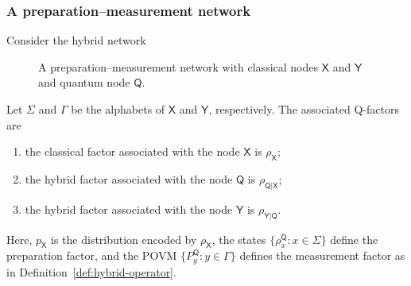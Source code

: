 \documentclass[
    aps,
    pra,
    reprint,
    superscriptaddress,
    nofootinbib
]{revtex4-2}
\theoremstyle{definition}
\theoremstyle{plain}
\begin{document}
\subsubsection{A preparation--measurement network}

Consider the hybrid network
\begin{figure}[ht]
    \centering
    \caption{A preparation--measurement network with classical nodes
    $\mathsf{X}$ and $\mathsf{Y}$ and quantum node $\mathsf{Q}$.}
    \label{fig:hybrid-network}
\end{figure}

Let $\Sigma$ and $\Gamma$ be the alphabets of $\mathsf{X}$ and
$\mathsf{Y}$, respectively. The associated Q-factors are
\begin{enumerate}
    \item the classical factor associated with the node
    $\mathsf{X}$ is $\rho_{\mathsf{X}}$;

    \item the hybrid factor associated with the node
    $\mathsf{Q}$ is $\rho_{\mathsf{Q}|\mathsf{X}}$;

    \item the hybrid factor associated with the node
    $\mathsf{Y}$ is $\rho_{\mathsf{Y}|\mathsf{Q}}$.
\end{enumerate}
Here, $p_{\mathsf{X}}$ is the distribution encoded by
$\rho_{\mathsf{X}}$, the states
$\{\rho_x^{\mathsf{Q}}:x\in\Sigma\}$ define the preparation factor, and
the POVM $\{P_y^{\mathsf{Q}}:y\in\Gamma\}$ defines the measurement factor
as in Definition~\ref{def:hybrid-operator}.
\end{document}
